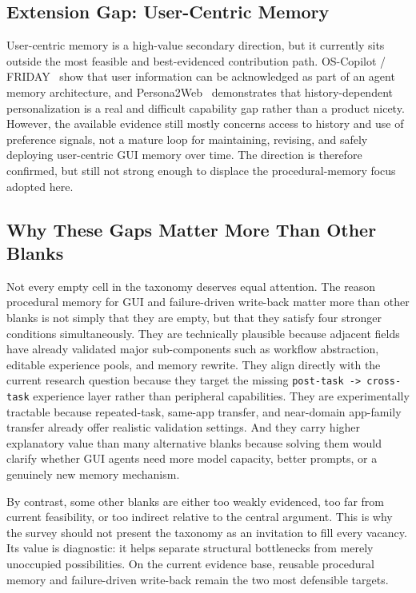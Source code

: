 \documentclass{article}
\begin{document}
\subsection{Extension Gap: User-Centric Memory}\label{64-extension-gap-user-centric-memory}

User-centric memory is a high-value secondary direction, but it
currently sits outside the most feasible and best-evidenced contribution
path. OS-Copilot / FRIDAY~\parencite{wu2024oscopilotgeneralistcomputeragents} show that user
information can be acknowledged as part of an agent memory architecture,
and
Persona2Web~\parencite{kim2026persona2webbenchmarkingpersonalizedweb} demonstrates that
history-dependent personalization is a real and difficult capability gap
rather than a product nicety. However, the available evidence still
mostly concerns access to history and use of preference signals, not a
mature loop for maintaining, revising, and safely deploying
user-centric GUI memory over time. The direction is therefore
confirmed, but still not strong enough to displace the
procedural-memory focus adopted here.

\subsection{Why These Gaps Matter More Than Other Blanks}\label{65-why-these-gaps-matter-more-than-other-blanks}

Not every empty cell in the taxonomy deserves equal attention. The
reason procedural memory for GUI and failure-driven write-back matter
more than other blanks is not simply that they are empty, but that they
satisfy four stronger conditions simultaneously. They are technically
plausible because adjacent fields have already validated major
sub-components such as workflow abstraction, editable experience pools,
and memory rewrite. They align directly with the current research
question because they target the missing
\texttt{post-task\ -\textgreater{}\ cross-task} experience layer rather
than peripheral capabilities. They are experimentally tractable because
repeated-task, same-app transfer, and near-domain app-family transfer
already offer realistic validation settings. And they carry higher
explanatory value than many alternative blanks because solving them
would clarify whether GUI agents need more model capacity, better
prompts, or a genuinely new memory mechanism.

By contrast, some other blanks are either too weakly evidenced, too far
from current feasibility, or too indirect relative to the central
argument. This is why the survey should not present the taxonomy as an
invitation to fill every vacancy. Its value is diagnostic: it helps
separate structural bottlenecks from merely unoccupied possibilities. On
the current evidence base, reusable procedural memory and failure-driven
write-back remain the two most defensible targets.
\end{document}
